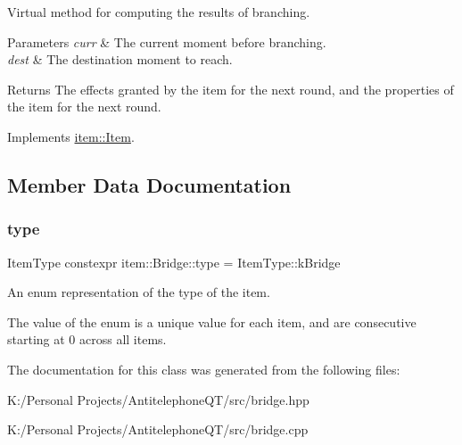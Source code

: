 Virtual method for computing the results of branching. 


\begin{DoxyParams}{Parameters}
{\em curr} & The current moment before branching. \\
\hline
{\em dest} & The destination moment to reach. \\
\hline
\end{DoxyParams}
\begin{DoxyReturn}{Returns}
The effects granted by the item for the next round, and the properties of the item for the next round. 
\end{DoxyReturn}


Implements \hyperlink{classitem_1_1_item_afef6bdd5c1c734c67122e4118e9e1930}{item\+::\+Item}.



\subsection{Member Data Documentation}
\mbox{\label{classitem_1_1_bridge_aeb376b4b999ec6144454cd806e5e06d2}} 
\subsubsection{\texorpdfstring{type}{type}}
{\footnotesize\ttfamily Item\+Type constexpr item\+::\+Bridge\+::type = Item\+Type\+::k\+Bridge\hspace{0.3cm}{\ttfamily [static]}}



An enum representation of the type of the item. 

The value of the enum is a unique value for each item, and are consecutive starting at 0 across all items. 

The documentation for this class was generated from the following files\+:\begin{DoxyCompactItemize}
\item 
K\+:/\+Personal Projects/\+Antitelephone\+Q\+T/src/bridge.\+hpp\item 
K\+:/\+Personal Projects/\+Antitelephone\+Q\+T/src/bridge.\+cpp\end{DoxyCompactItemize}
